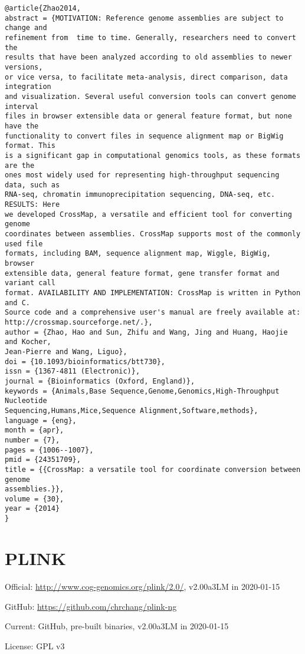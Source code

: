 \documentclass[]{article}
\begin{document}
\begin{verbatim}
@article{Zhao2014,
abstract = {MOTIVATION: Reference genome assemblies are subject to change and
refinement from  time to time. Generally, researchers need to convert the
results that have been analyzed according to old assemblies to newer versions,
or vice versa, to facilitate meta-analysis, direct comparison, data integration
and visualization. Several useful conversion tools can convert genome interval
files in browser extensible data or general feature format, but none have the
functionality to convert files in sequence alignment map or BigWig format. This
is a significant gap in computational genomics tools, as these formats are the
ones most widely used for representing high-throughput sequencing data, such as
RNA-seq, chromatin immunoprecipitation sequencing, DNA-seq, etc. RESULTS: Here
we developed CrossMap, a versatile and efficient tool for converting genome
coordinates between assemblies. CrossMap supports most of the commonly used file
formats, including BAM, sequence alignment map, Wiggle, BigWig, browser
extensible data, general feature format, gene transfer format and variant call
format. AVAILABILITY AND IMPLEMENTATION: CrossMap is written in Python and C.
Source code and a comprehensive user's manual are freely available at:
http://crossmap.sourceforge.net/.},
author = {Zhao, Hao and Sun, Zhifu and Wang, Jing and Huang, Haojie and Kocher,
Jean-Pierre and Wang, Liguo},
doi = {10.1093/bioinformatics/btt730},
issn = {1367-4811 (Electronic)},
journal = {Bioinformatics (Oxford, England)},
keywords = {Animals,Base Sequence,Genome,Genomics,High-Throughput Nucleotide
Sequencing,Humans,Mice,Sequence Alignment,Software,methods},
language = {eng},
month = {apr},
number = {7},
pages = {1006--1007},
pmid = {24351709},
title = {{CrossMap: a versatile tool for coordinate conversion between genome
assemblies.}},
volume = {30},
year = {2014}
}
\end{verbatim}

\section{PLINK}

Official: \url{http://www.cog-genomics.org/plink/2.0/}, v2.00a3LM in 2020-01-15

GitHub: \url{https://github.com/chrchang/plink-ng}

Current: GitHub, pre-built binaries, v2.00a3LM in 2020-01-15

License: GPL v3
\end{document}

